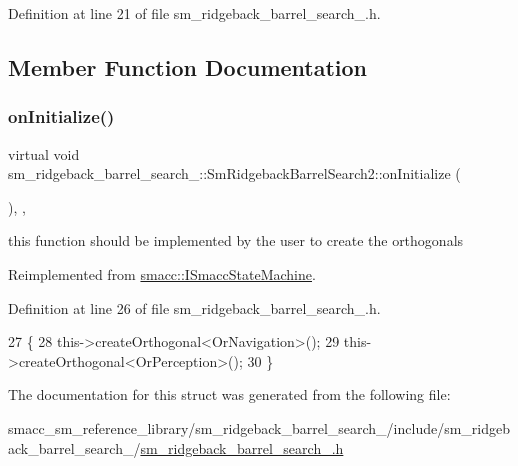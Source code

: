 Definition at line 21 of file sm\+\_\+ridgeback\+\_\+barrel\+\_\+search\+\_.\+h.



\subsection{Member Function Documentation}
\mbox{\label{structsm__ridgeback__barrel__search__2_1_1SmRidgebackBarrelSearch2_ab2f289c0f29d410439767a2f32cb0706}} 
\subsubsection{\texorpdfstring{on\+Initialize()}{onInitialize()}}
{\footnotesize\ttfamily virtual void sm\+\_\+ridgeback\+\_\+barrel\+\_\+search\+\_\+::\+Sm\+Ridgeback\+Barrel\+Search2\+::on\+Initialize (\begin{DoxyParamCaption}{ }\end{DoxyParamCaption})\hspace{0.3cm}{\ttfamily [inline]}, {\ttfamily [override]}, {\ttfamily [virtual]}}



this function should be implemented by the user to create the orthogonals 



Reimplemented from \hyperlink{classsmacc_1_1ISmaccStateMachine_ac2982c6c8283663e5e1e8a7c82f511ec}{smacc\+::\+I\+Smacc\+State\+Machine}.



Definition at line 26 of file sm\+\_\+ridgeback\+\_\+barrel\+\_\+search\+\_.\+h.


\begin{DoxyCode}
27     \{
28         this->createOrthogonal<OrNavigation>();
29         this->createOrthogonal<OrPerception>();
30     \}
\end{DoxyCode}


The documentation for this struct was generated from the following file\+:\begin{DoxyCompactItemize}
\item 
smacc\+\_\+sm\+\_\+reference\+\_\+library/sm\+\_\+ridgeback\+\_\+barrel\+\_\+search\+\_/include/sm\+\_\+ridgeback\+\_\+barrel\+\_\+search\+\_/\hyperlink{sm__ridgeback__barrel__search__2_8h}{sm\+\_\+ridgeback\+\_\+barrel\+\_\+search\+\_.\+h}\end{DoxyCompactItemize}
